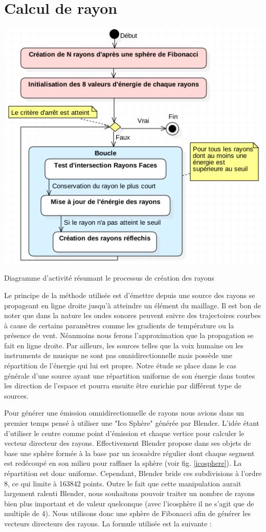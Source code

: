\section{Calcul de rayon} \label{sect_rayon}

\begin{figureth}
	\includegraphics[width=0.6\linewidth]{images/DiagRay}
	\caption{Diagramme d'activité résumant le processus de création des rayons}
	\label{DiagRay}
\end{figureth}

Le principe de la méthode utilisée est d'émettre depuis une source des rayons se propageant en ligne droite jusqu'à atteindre un élément du maillage. Il est bon de noter que dans la nature les ondes sonores peuvent suivre des trajectoires courbes à cause de certains paramètres comme les gradients de température ou la présence de vent. Néanmoins nous ferons l'approximation que la propagation se fait en ligne droite. Par ailleurs, les sources telles que la voix humaine ou les instruments de musique ne sont pas omnidirectionnelle mais possède une répartition de l'énergie qui lui est propre. Notre étude se place dans le cas générale d'une source ayant une répartition uniforme de son énergie dans toutes les direction de l'espace et pourra ensuite être enrichie par différent type de sources. 

Pour générer une émission omnidirectionnelle de rayons nous avions dans un premier temps pensé à utiliser une "Ico Sphère" générée par Blender. L'idée étant d'utiliser le centre comme point d'émission et chaque vertice pour calculer le vecteur directeur des rayons. Effectivement Blender propose dans ses objets de base une sphère formée à la base par un icosaèdre régulier dont chaque segment est redécoupé en son milieu pour raffiner la sphère (voir fig. \ref{icosphere}). La répartition est donc uniforme. Cependant, Blender bride ces subdivisions à l'ordre 8, ce qui limite à 163842 points. Outre le fait que cette manipulation aurait largement ralenti Blender, nous souhaitons pouvoir traiter un nombre de rayons bien plus important et de valeur quelconque (avec l'icosphère il ne s'agit que de multiple de 4). Nous utilisons donc une sphère de Fibonacci afin de générer les vecteurs directeurs des rayons. La formule utilisée est la suivante :

